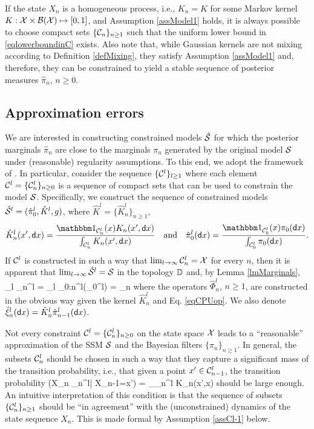 \documentclass[onefignum,onetabnum]{siamonline250211}%
\begin{document}
If the state $X_n$ is a homogeneous process, i.e., $K_n=K$ for some Markov kernel $K:{\mathcal X}\times{\mathcal B}({\mathcal X})\mapsto[0,1]$, and Assumption \ref{assModel1} holds, it is always possible to choose compact sets $\{ {\mathcal C}_n \}_{n \ge 1}$ such that the uniform lower bound in \eqref{eqlowerboundinC} exists. Also note that, while Gaussian kernels are not mixing according to Definition \ref{defMixing}, they satisfy Assumption \ref{assModel1} and, therefore, they can be constrained to yield a stable sequence of posterior measures $\hat \pi_n$, $n \ge 0$.


%
\subsection{Approximation errors} \label{ssApproxErr}

We are interested in constructing constrained models $\hat {{\mathcal S}}$ for which the posterior marginals $\hat \pi_n$ are close to the marginals $\pi_n$ generated by the original model ${\mathcal S}$ under (reasonable) regularity assumptions. To this end, we adopt the framework of \cite{Crisan20}. In particular, consider the sequence $\{{\mathcal C}^l\}_{l\ge 1}$ where each element ${\mathcal C}^l = \{ {\mathcal C}_n^l \}_{n \ge 0}$ is a sequence of compact sets that can be used to constrain the model ${\mathcal S}$. Specifically, we construct the sequence of constrained models $\hat {{\mathcal S}}^l=(\hat \pi_0^l,\hat K^l, g)$, where $\hat K^l = \{\hat K_n^l\}_{n\ge 1}$, 
$$
\hat K_n^l(x',\sd x) = \frac{
    \Ind_{\mC_n^l}(x)K_n(x',\sd x)
}{
    \int_{\mC_n^l} K_n(x',\sd x)
}
\quad
\text{and}
\quad
\hat \pi_0^l(\sd x) = \frac{\Ind_{\mC_0^l}(x)\pi_0(\sd x)}{\int_{\mC_0^l} \pi_0(\sd x)}.
$$
If ${\mathcal C}^l$ is constructed in such a way that $\lim_{l\to\infty} {\mathcal C}_n^l = {\mathcal X}$ for every $n$, then it is apparent that $\lim_{l\to\infty} \hat {{\mathcal S}}^l = {\mathcal S}$ in the topology $\mathbb{D}$ and, by Lemma \ref{lmMarginals},
\beq
\lim_{l\to\infty} \hat \pi_n^l = \lim_{l\to\infty} \hat \Phi_{0:n}^l(\hat \pi_0^l) = \pi_n \quad {}
\nn
\eeq
where the operators $\hat\Phi_n^l$, $n \ge 1$, are constructed in the obvious way given the kernel $\hat K_n^l$ and Eq. \eqref{eqCPUop}. We also denote $\hat\xi_n^l({\sf d} x)=\hat K_n^l\hat \pi_{n-1}^l({\sf d} x)$.

Not every constraint ${\mathcal C}^l=\{{\mathcal C}_n^l\}_{n\ge 0}$ on the state space ${\mathcal X}$ leads to a ``reasonable'' approximation of the SSM ${\mathcal S}$ and the Bayesian filters $\{\pi_n\}_{n\ge 1}$. In general, the subsets ${\mathcal C}_{n}^l$ should be chosen in such a way that they capture a significant mass of the transition probability, i.e., that given a point $x'\in{\mathcal C}_{n-1}^l$, the transition probability 
\beq
\mbP(X_n \in \mC_n^l| X_{n-1}=x') = \int_{\mC_n^l} K_n(x',\sd x)
\nn
\eeq
should be large enough. An intuitive interpretation of this condition is that the sequence of subsets $\{{\mathcal C}_n^l\}_{n\ge 1}$ should be ``in agreement'' with the (unconstrained) dynamics of the state sequence $X_n$. This is made formal by Assumption \ref{assCl-1} below.
\end{document}
